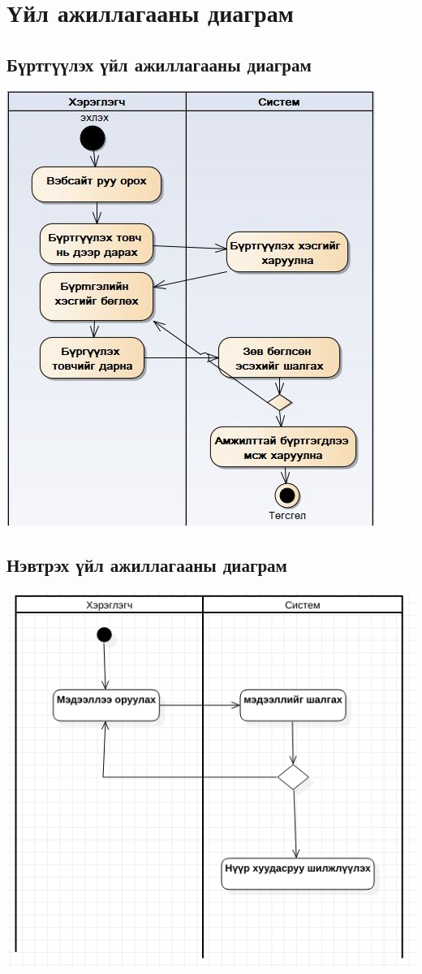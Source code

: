 \documentclass[
oneside, %
english, %
onehalfspacing, %
nolistspacing, %
headsepline, %
]{article} %
\begin{document}
     	\section{Үйл ажиллагааны диаграм}
     	\subsection{Бүртгүүлэх үйл ажиллагааны диаграм}
     	\includegraphics[width=\textwidth]{regActivity}
     	\subsection{Нэвтрэх үйл ажиллагааны диаграм}
     	\includegraphics[width=\textwidth]{loginActivity}
\end{document}
